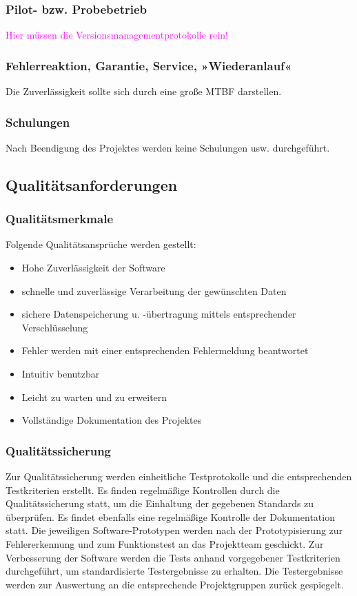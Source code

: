 \subsubsection{Pilot- bzw. Probebetrieb}
\textcolor{magenta}{Hier müssen die Versionsmanagementprotokolle rein!}




\subsubsection{Fehlerreaktion, Garantie, Service, »Wiederanlauf«}
Die Zuverlässigkeit sollte sich durch eine große \ac{MTBF} darstellen.



\subsubsection{Schulungen}
Nach Beendigung des Projektes werden keine Schulungen usw. durchgeführt.


\subsection{\textbf{Qualitätsanforderungen}}

\subsubsection{Qualitätsmerkmale}
Folgende Qualitätsansprüche werden gestellt:
\begin{itemize}
	\item Hohe Zuverlässigkeit der Software
	\item schnelle und zuverlässige Verarbeitung der gewünschten Daten
	\item sichere Datenspeicherung u. -übertragung mittels entsprechender Verschlüsselung
	\item Fehler werden mit einer entsprechenden Fehlermeldung beantwortet
	\item Intuitiv benutzbar
	\item Leicht zu warten und zu erweitern
	\item Vollständige Dokumentation des Projektes
\end{itemize}




\subsubsection{Qualitätssicherung}
Zur Qualitätssicherung werden einheitliche Testprotokolle und die entsprechenden Testkriterien erstellt. Es finden regelmäßige Kontrollen durch die Qualitätssicherung statt, um die Einhaltung der gegebenen Standards zu überprüfen. Es findet ebenfalls eine regelmäßige Kontrolle der Dokumentation statt. Die jeweiligen Software-Prototypen werden nach der Prototypisierung zur Fehlererkennung und zum Funktionstest an das Projektteam geschickt. Zur Verbesserung der Software werden die Tests anhand vorgegebener Testkriterien durchgeführt, um standardisierte Testergebnisse zu erhalten. Die Testergebnisse werden zur Auswertung an die entsprechende Projektgruppen zurück gespiegelt.


